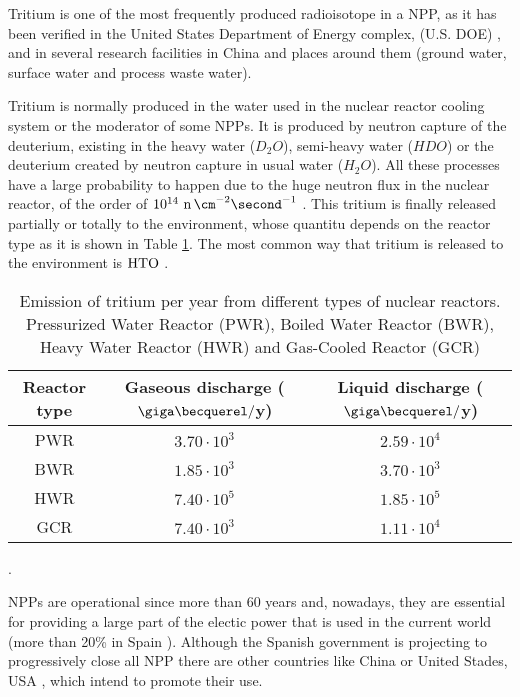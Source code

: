 Tritium is one of the most frequently produced radioisotope in a NPP, as it has been verified in the United States Department of Energy complex, (U.S. DOE) \cite{FiberDetector1a}, \cite{FiberDetector1b} and in several research facilities in China \cite{CommonEmissionTritium} and places around them (ground water, surface water and process waste water).

Tritium is normally produced in the water used in the nuclear reactor cooling system or the moderator of some NPPs. It is produced by neutron capture of the deuterium, existing in the heavy water ($D_2 O$), semi-heavy water ($H D O$) or the deuterium created by neutron capture in usual water ($H_2 O$). All these processes have a large probability to happen due to the huge neutron flux in the nuclear reactor, of the order of $10^{14} ~\ce{n} \, \cm^{-2} \second^{-1}$ \cite{CrossSeccionNeutrons}. This tritium is finally released partially or totally to the environment, whose quantitu depends on the reactor type as it is shown in Table \ref{tab:TritiumEmisionsNPPs}. The most common way that tritium is released to the environment is $\ce{HTO}$ \cite{CommonEmissionTritium}.

\begin{table}[htbp]
\begin{center}
\begin{tabular}{|c|c|c|}
\hline
Reactor type & Gaseous discharge ($\giga\becquerel/$y) & Liquid discharge ($\giga\becquerel/$y) \\
\hline \hline \hline
PWR & $3.70\cdot 10^{3}$ & $2.59\cdot 10^{4}$ \\ \hline
BWR & $1.85\cdot 10^{3}$ & $3.70\cdot 10^{3}$ \\ \hline
HWR & $7.40\cdot 10^{5}$ & $1.85\cdot 10^{5}$ \\ \hline
GCR & $7.40\cdot 10^{3}$ & $1.11\cdot 10^{4}$ \\ \hline
\end{tabular}
\caption{Emission of tritium per year from different types of nuclear reactors. Pressurized Water Reactor (PWR), Boiled Water Reactor (BWR), Heavy Water Reactor (HWR) and Gas-Cooled Reactor (GCR) \cite{CommonEmissionTritium}}.
\label{tab:TritiumEmisionsNPPs}
\end{center}
\end{table} 

NPPs are operational since more than 60 years and, nowadays, they are essential for providing a large part of the electic power that is used in the current world (more than 20\% in Spain \cite{PercentageEnergySpain}). Although the Spanish government is projecting to progressively close all NPP there are other countries like China \cite{60ReactorsChina} or United Stades, USA \cite{35MillionsUSA}, which intend to promote their use.

